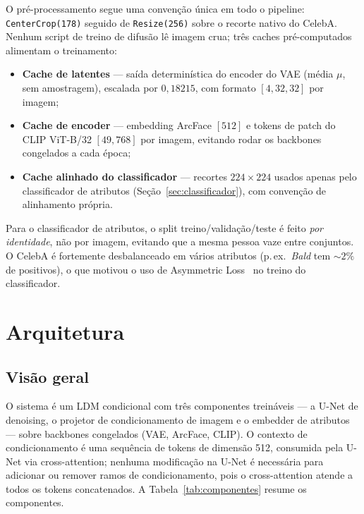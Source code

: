 \documentclass[10pt,twocolumn]{article}
\begin{document}
O pré-processamento segue uma convenção única em todo o pipeline:
\texttt{CenterCrop(178)} seguido de \texttt{Resize(256)} sobre o recorte
nativo do CelebA. Nenhum script de treino de difusão lê imagem crua; três
caches pré-computados alimentam o treinamento:

\begin{itemize}
  \item \textbf{Cache de latentes} --- saída determinística do encoder do
    VAE (média $\mu$, sem amostragem), escalada por $0{,}18215$, com
    formato $[4, 32, 32]$ por imagem;
  \item \textbf{Cache de encoder} --- embedding ArcFace $[512]$ e tokens
    de patch do CLIP ViT-B/32 $[49, 768]$ por imagem, evitando rodar os
    backbones congelados a cada época;
  \item \textbf{Cache alinhado do classificador} --- recortes
    $224{\times}224$ usados apenas pelo classificador de atributos
    (Seção~\ref{sec:classificador}), com convenção de alinhamento
    própria.
\end{itemize}

Para o classificador de atributos, o split treino/validação/teste é feito
\emph{por identidade}, não por imagem, evitando que a mesma pessoa vaze
entre conjuntos. O CelebA é fortemente desbalanceado em vários atributos
(p.\,ex.\ \emph{Bald} tem ${\sim}2\%$ de positivos), o que motivou o uso
de Asymmetric Loss~\cite{benbaruch2021} no treino do classificador.

\section{Arquitetura}

\subsection{Visão geral}

O sistema é um LDM condicional com três componentes treináveis --- a
U-Net de denoising, o projetor de condicionamento de imagem e o embedder
de atributos --- sobre backbones congelados (VAE, ArcFace, CLIP). O
contexto de condicionamento é uma sequência de tokens de dimensão 512,
consumida pela U-Net via cross-attention; nenhuma modificação na U-Net é
necessária para adicionar ou remover ramos de condicionamento, pois o
cross-attention atende a todos os tokens concatenados. A
Tabela~\ref{tab:componentes} resume os componentes.
\end{document}
